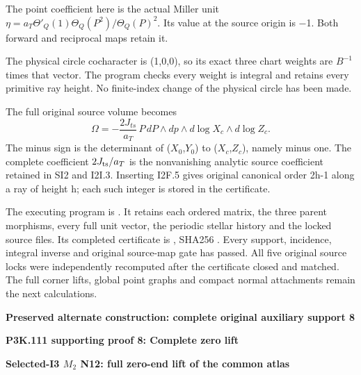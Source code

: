 The point coefficient here is the actual Miller unit
\(\eta=a_T \Theta'_Q(1) \Theta_Q(P^{2})/\Theta_Q(P)^{2}\). Its value at the
source origin is −1. Both forward and reciprocal maps retain it.

The physical circle cocharacter is (1,0,0),
so its exact three chart weights are \(B^{-1}\)
times that vector. The program checks every weight is integral and retains every
primitive ray height. No finite-index
change of the physical circle has been made.

The full original source volume becomes
\[
 \Omega=-\frac{2J_{ts}}{a_T}\,
 P\,dP\wedge dp\wedge d\log X_c\wedge d\log Z_c.
 \tag{I2F.10}
\]
The minus sign is the determinant of
(\(X_{0}\),\(Y_{0}\)) to (\(X_c\),\(Z_c\)), namely minus one.
The complete coefficient \(2J_{\rm ts}/a_T\) is the
nonvanishing analytic source coefficient retained in SI2 and I2I.3. Inserting I2F.5 gives original
canonical order 2h-1 along a ray of height h;
each such integer is stored in the certificate.

The executing program is
. It retains each
ordered matrix, the three parent morphisms, every full unit vector,
the periodic stellar history and the locked source files. Its completed
certificate is ,
SHA256 .
Every support, incidence, integral inverse and original source-map
gate has passed. All five original source locks were independently
recomputed after the certificate closed and matched. The full
corner lifts, global point graphs and compact normal attachments
remain the next calculations.






\par\bigskip\noindent\textbf{Preserved alternate construction: complete original auxiliary support 8}\par
\par\bigskip\noindent\textbf{P3K.111 supporting proof 8: Complete zero lift}\par\nobreak
\par

\medskip\noindent\textbf{Selected-I3 \(M_{2}\) N12: full zero-end lift of the common atlas}

\par\nobreak


